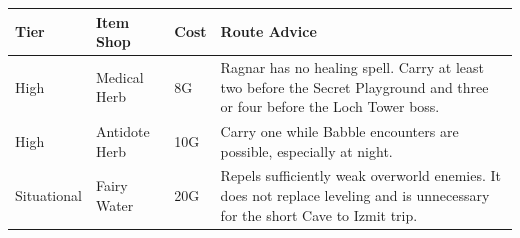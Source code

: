 \documentclass[
  american,
  10pt,
  letterpaper,
  oneside,
  open=any]{scrreprt}
\newcounter{none} %
\newenvironment{guidetable}{%
  \small\setstretch{1.0}%
  \setlength{\tabcolsep}{4pt}%
  \setlength{\LTpre}{8pt}\setlength{\LTpost}{10pt}%
  \renewcommand{\arraystretch}{1.16}%
}{ }
\begin{document}
\begin{guidetable}

{\def\LTcaptype{none} %
\begin{longtable}[]{@{}
  >{\raggedright\arraybackslash}p{}
  >{\raggedright\arraybackslash}p{}
  >{\raggedleft\arraybackslash}p{}
  >{\raggedright\arraybackslash}p{}@{}}
\toprule\noalign{}
\begin{minipage}[b]{\linewidth}\raggedright
\color{GuideGreen}\bfseries Tier
\end{minipage} & \begin{minipage}[b]{\linewidth}\raggedright
\color{GuideGreen}\bfseries Item Shop
\end{minipage} & \begin{minipage}[b]{\linewidth}\raggedleft
\color{GuideGreen}\bfseries Cost
\end{minipage} & \begin{minipage}[b]{\linewidth}\raggedright
\color{GuideGreen}\bfseries Route Advice
\end{minipage} \\
\midrule\noalign{}
\endhead
\bottomrule\noalign{}
\endlastfoot
High & Medical Herb & 8G & Ragnar has no healing spell. Carry at least
two before the Secret Playground and three or four before the Loch Tower
boss. \\
High & Antidote Herb & 10G & Carry one while Babble encounters are
possible, especially at night. \\
Situational & Fairy Water & 20G & Repels sufficiently weak overworld
enemies. It does not replace leveling and is unnecessary for the short
Cave to Izmit trip. \\
\end{longtable}
}

\end{guidetable}
\end{document}
